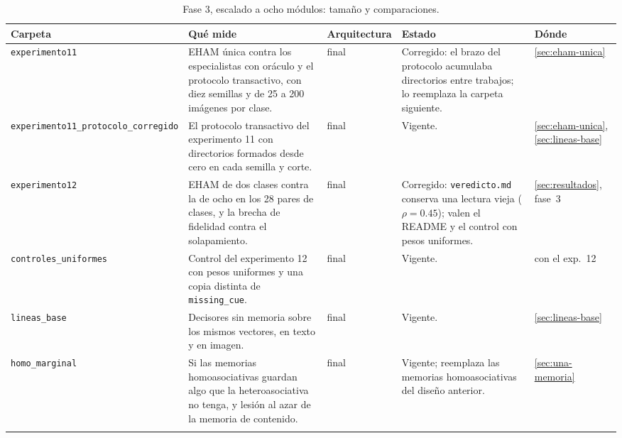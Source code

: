 \begin{table}[H]
\centering
\caption[Fase 3, escalado a ocho módulos: tamaño y comparaciones]{Fase 3, escalado a ocho módulos: tamaño y comparaciones.}
\label{tab:fase3-comparaciones}
\label{tab:exp-comparaciones}
\footnotesize
\setlength{\tabcolsep}{3pt}
\begin{tabular}{p{3.1cm}p{4.7cm}p{2.0cm}p{3.1cm}p{1.6cm}}
\toprule
Carpeta & Qué mide & Arquitectura & Estado & Dónde \tabularnewline
\midrule
\raggedright \texttt{experimento11} &
\raggedright EHAM única contra los especialistas con oráculo y el protocolo transactivo, con diez semillas y de 25 a 200 imágenes por clase. &
\raggedright final &
\raggedright Corregido: el brazo del protocolo acumulaba directorios entre trabajos; lo reemplaza la carpeta siguiente. &
\raggedright \ref{sec:eham-unica} \tabularnewline\addlinespace[4pt]
\raggedright \texttt{experimento11\_\allowbreak protocolo\_\allowbreak corregido} &
\raggedright El protocolo transactivo del experimento 11 con directorios formados desde cero en cada semilla y corte. &
\raggedright final &
\raggedright Vigente. &
\raggedright \ref{sec:eham-unica}, \ref{sec:lineas-base} \tabularnewline\addlinespace[4pt]
\raggedright \texttt{experimento12} &
\raggedright EHAM de dos clases contra la de ocho en los 28 pares de clases, y la brecha de fidelidad contra el solapamiento. &
\raggedright final &
\raggedright Corregido: \texttt{veredicto.md} conserva una lectura vieja ($\rho = 0.45$); valen el README y el control con pesos uniformes. &
\raggedright \ref{sec:resultados}, fase~3 \tabularnewline\addlinespace[4pt]
\raggedright \texttt{controles\_\allowbreak uniformes} &
\raggedright Control del experimento 12 con pesos uniformes y una copia distinta de \texttt{missing\_\allowbreak cue}. &
\raggedright final &
\raggedright Vigente. &
\raggedright con el exp.~12 \tabularnewline\addlinespace[4pt]
\raggedright \texttt{lineas\_\allowbreak base} &
\raggedright Decisores sin memoria sobre los mismos vectores, en texto y en imagen. &
\raggedright final &
\raggedright Vigente. &
\raggedright \ref{sec:lineas-base} \tabularnewline\addlinespace[4pt]
\raggedright \texttt{homo\_\allowbreak marginal} &
\raggedright Si las memorias homoasociativas guardan algo que la heteroasociativa no tenga, y lesión al azar de la memoria de contenido. &
\raggedright final &
\raggedright Vigente; reemplaza las memorias homoasociativas del diseño anterior. &
\raggedright \ref{sec:una-memoria} \tabularnewline\addlinespace[4pt]
\bottomrule
\end{tabular}
\end{table}


